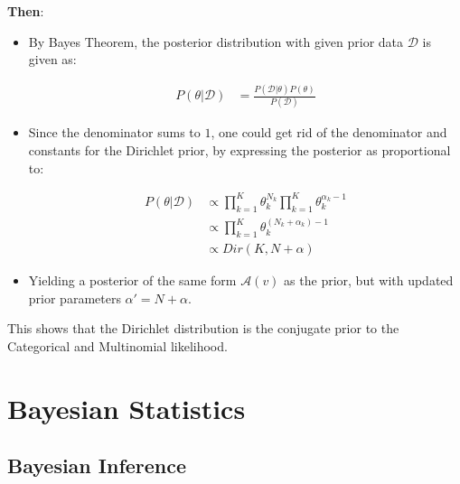 \textbf{Then}:

\begin{itemize}
	\item  By Bayes Theorem, the posterior distribution with given prior data $\mathcal{D}$ is given as:
	
\begin{equation}
\begin{split}
	P(\theta | \mathcal{D}) &= \frac{P(\mathcal{D} | \theta) P(\theta)}{P(\mathcal{D})}
\end{split}
\end{equation}

	\item Since the denominator sums to $1$, one could get rid of the denominator and constants for the Dirichlet prior, by expressing the posterior as proportional to:

\begin{equation}
\begin{split}
		P(\theta | \mathcal{D}) &\propto \prod_{k=1}^{K} \theta_{k}^{N_{k}} \prod_{k=1}^{K} \theta_{k}^{\alpha_{k} - 1}\\
		&\propto \prod_{k=1}^{K} \theta_{k}^{(N_{k} + \alpha_{k}) - 1} \\
		&\propto Dir(K, N + \alpha) 
\end{split}
\end{equation}

\item Yielding a posterior of the same form $\mathcal{A}(v)$ as the prior, but with updated prior parameters $\alpha' = N + \alpha$.

\end{itemize}

This shows that the Dirichlet distribution is the conjugate prior to the Categorical and Multinomial likelihood.









\section{Bayesian Statistics}
\label{sec:probability:bayesian_stats}












\subsection{Bayesian Inference}
\label{sec:probability:bayesian_stats:bayesian_inference}












